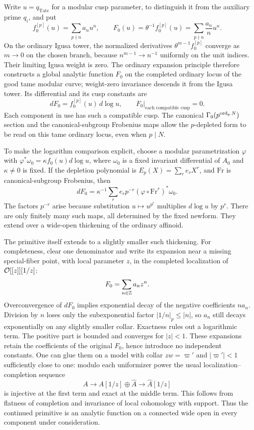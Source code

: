 Write $u=q_{\mathrm{Tate}}$ for a modular cusp parameter, to distinguish
it from the auxiliary prime $q_i$, and put
\[
 f_0^{[p]}(u)=\sum_{p\nmid n}a_nu^n,\qquad
 F_0(u)=\theta^{-1}f_0^{[p]}(u)
       =\sum_{p\nmid n}\frac{a_n}{n}u^n.
\]
On the ordinary Igusa tower, the normalized derivatives
$\theta^{m-1}f_0^{[p]}$ converge as $m\to0$ on the chosen branch, because
$n^{m-1}\to n^{-1}$ uniformly on the unit indices.  Their limiting
Igusa weight is zero.  The ordinary expansion principle therefore
constructs a global analytic function $F_0$ on the completed ordinary
locus of the good tame modular curve; weight-zero invariance descends
it from the Igusa tower.  Its differential and its cusp constants are
\begin{equation}\label{eq:inverse-katz-primitive}
 dF_0=f_0^{[p]}(u)\,d\log u,
 \qquad F_0|_{\text{each compatible cusp}}=0.
\end{equation}
Each component in use has such a compatible cusp.  The canonical
$\Gamma_0(p^{\operatorname{ord}_pN})$ section and the canonical-subgroup Frobenius
maps allow the $p$-depleted form to be read on this tame ordinary locus,
even when $p\mid N$.

To make the logarithm comparison explicit, choose a modular
parametrization $\varphi$ with
$\varphi^*\omega_0=\kappa f_0(u)d\log u$, where $\omega_0$ is a fixed
invariant differential of $A_0$ and $\kappa\ne0$ is fixed.  If the
depletion polynomial is $E_p(X)=\sum_r e_rX^r$, and $\mathrm{Fr}$ is
canonical-subgroup Frobenius, then
\begin{equation}\label{eq:depletion-differential}
 dF_0=\kappa^{-1}\sum_r e_rp^{-r}
       (\varphi\circ\mathrm{Fr}^{r})^*\omega_0.
\end{equation}
The factors $p^{-r}$ arise because substitution $u\mapsto u^{p^r}$
multiplies $d\log u$ by $p^r$.  There are only finitely many such maps,
all determined by the fixed newform.  They extend over a wide-open
thickening of the ordinary affinoid.

The primitive itself extends to a slightly smaller such thickening.
For completeness, clear one denominator and write its expansion near a
missing special-fiber point, with local parameter $z$, in the completed
localization of $\mathcal O[[z]][1/z]$:
\[
 F_0=\sum_{n\in\mathbb Z}a_nz^n.
\]
Overconvergence of $dF_0$ implies exponential decay of the negative
coefficients $na_n$.  Division by $n$ loses only the subexponential
factor $|1/n|_p\le |n|$, so $a_n$ still decays exponentially on any
slightly smaller collar.  Exactness rules out a logarithmic term.  The
positive part is bounded and converges for $|z|<1$.  These expansions
retain the coefficients of the original $F_0$, hence introduce no
independent constants.  One can glue them on a model with collar
$zw=\varpi'$ and $|\varpi'|<1$ sufficiently close to one: modulo each
uniformizer power the usual localization--completion sequence
\[
 A\longrightarrow A[1/z]\oplus\widehat A
 \longrightarrow\widehat A[1/z]
\]
is injective at the first term and exact at the middle term.  This
follows from flatness of completion and invariance of local cohomology
with support.  Thus the continued primitive is an analytic function on
a connected wide open in every component under consideration.

